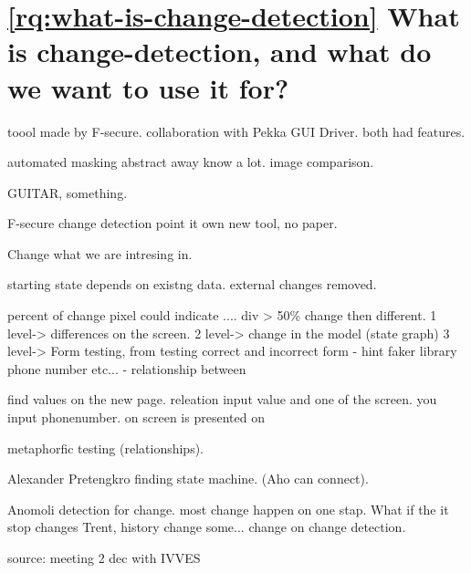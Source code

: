 \section{\ref{rq:what-is-change-detection} What is change-detection, and what do we want to use it for?}



toool made by F-secure. collaboration with Pekka GUI Driver. both had features. 

automated masking abstract away know a lot. image comparison. 

GUITAR, something. 

F-secure change detection point it own 
new tool, no paper. 

Change what we are intresing in.

starting state depends on existng data. external changes removed. 

percent of change pixel could indicate .... div > 50\% change then different. 
1 level-> differences on the screen.
2 level-> change in the model (state graph)
3 level-> Form testing, from testing correct and incorrect form
 - hint faker library phone number etc...
 - relationship between 

find values on the new page. releation input value and one of the screen. you input phonenumber. on screen is presented on

metaphorfic testing (relationships). 

Alexander Pretengkro finding state machine. (Aho can connect).

Anomoli detection for change. most change happen on one stap. What if the it stop changes Trent, history change some... change on change detection. 
 
 source: meeting 2 dec with IVVES 